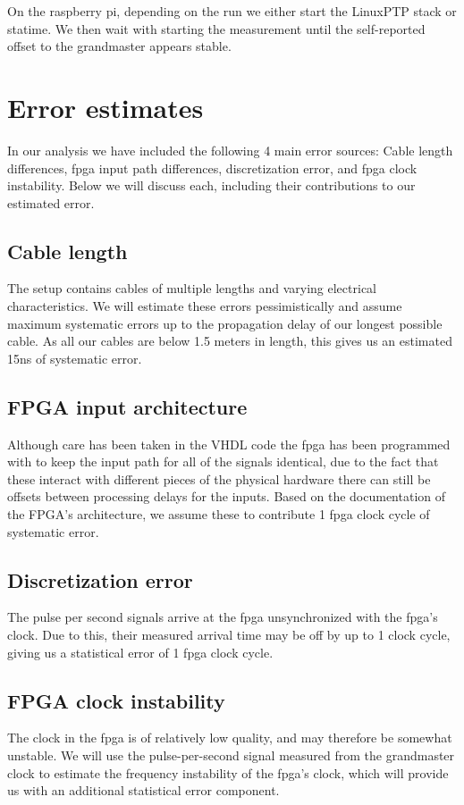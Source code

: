 \documentclass{article}
\begin{document}
On the raspberry pi, depending on the run we either start the LinuxPTP stack or statime. We then wait with starting the measurement until the self-reported offset to the grandmaster appears stable.

\section{Error estimates}

In our analysis we have included the following 4 main error sources: Cable length differences, fpga input path differences, discretization error, and fpga clock instability. Below we will discuss each, including their contributions to our estimated error.
\subsection{Cable length}
The setup contains cables of multiple lengths and varying electrical characteristics. We will estimate these errors pessimistically and assume maximum systematic errors up to the propagation delay of our longest possible cable. As all our cables are below 1.5 meters in length, this gives us an estimated 15ns of systematic error.
\subsection{FPGA input architecture}
Although care has been taken in the VHDL code the fpga has been programmed with to keep the input path for all of the signals identical, due to the fact that these interact with different pieces of the physical hardware there can still be offsets between processing delays for the inputs. Based on the documentation of the FPGA's architecture, we assume these to contribute 1 fpga clock cycle of systematic error.
\subsection{Discretization error}
The pulse per second signals arrive at the fpga unsynchronized with the fpga's clock. Due to this, their measured arrival time may be off by up to 1 clock cycle, giving us a statistical error of 1 fpga clock cycle.
\subsection{FPGA clock instability}
The clock in the fpga is of relatively low quality, and may therefore be somewhat unstable. We will use the pulse-per-second signal measured from the grandmaster clock to estimate the frequency instability of the fpga's clock, which will provide us with an additional statistical error component.
\end{document}
